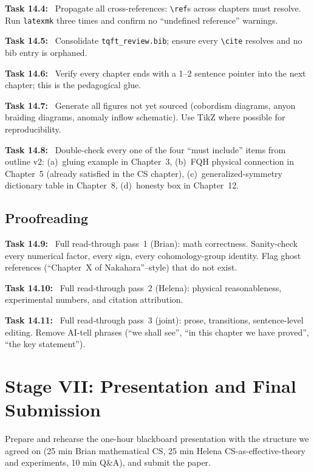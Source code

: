 \documentclass[11pt]{article}
\newcommand{\task}[1]{\medskip\noindent\textbf{Task #1:}\ }
\begin{document}
\task{14.4} Propagate all cross-references: \texttt{\textbackslash ref}s across chapters
must resolve. Run \texttt{latexmk} three times and confirm no ``undefined reference''
warnings.

\task{14.5} Consolidate \texttt{tqft\_review.bib}; ensure every \texttt{\textbackslash cite}
resolves and no bib entry is orphaned.

\task{14.6} Verify every chapter ends with a 1--2 sentence pointer into the next chapter;
this is the pedagogical glue.

\task{14.7} Generate all figures not yet sourced (cobordism diagrams, anyon braiding
diagrams, anomaly inflow schematic). Use TikZ where possible for reproducibility.

\task{14.8} Double-check every one of the four ``must include'' items from outline v2:
(a)~gluing example in Chapter~3, (b)~FQH physical connection in Chapter~5 (already
satisfied in the CS chapter), (c)~generalized-symmetry dictionary table in Chapter~8,
(d)~honesty box in Chapter~12.

\subsection{Proofreading}

\task{14.9} Full read-through pass~1 (Brian): math correctness. Sanity-check every
numerical factor, every sign, every cohomology-group identity. Flag ghost
references (``Chapter~X of Nakahara''--style) that do not exist.

\task{14.10} Full read-through pass~2 (Helena): physical reasonableness, experimental
numbers, and citation attribution.

\task{14.11} Full read-through pass~3 (joint): prose, transitions, sentence-level
editing. Remove AI-tell phrases (``we shall see'', ``in this chapter we have proved'',
``the key statement'').

\section{Stage VII: Presentation and Final Submission}\label{sec:stageVII}

\begin{goalbox}[Objective]
Prepare and rehearse the one-hour blackboard presentation with the structure we agreed
on (25 min Brian mathematical CS, 25 min Helena CS-as-effective-theory and experiments,
10 min Q\&A), and submit the paper.
\end{goalbox}
\end{document}
